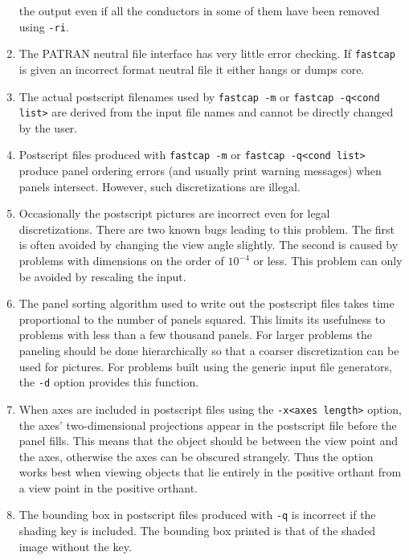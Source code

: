 \begin{enumerate}
the output even if all the conductors in some of them have been
removed using {\tt -ri}.
\item The PATRAN neutral file interface has very little error checking.
If {\tt fastcap} is given an incorrect format neutral file it either
hangs or dumps core.
\item The actual postscript filenames used by {\tt fastcap -m} or 
{\tt fastcap -q<cond list>} are derived from the input file names and cannot
be directly changed by the user.
\item Postscript files produced with {\tt fastcap -m} or 
{\tt fastcap -q<cond list>} produce panel ordering errors (and
usually print warning messages) when panels intersect. However, such
discretizations are illegal.
\item Occasionally the postscript pictures are incorrect even
for legal discretizations. There are two known bugs leading
to this problem.  The first is often avoided by changing
the view angle slightly. The second is caused by problems with
dimensions on the order of $10^{-4}$ or less. This problem can
only be avoided by rescaling the input. 
%
\item The panel sorting algorithm used to write out the postscript files
takes time proportional to the number of panels squared.  This limits
its usefulness to problems with less than a few thousand panels. For
larger problems the paneling should be done hierarchically so that
a coarser discretization can be used for pictures. For problems built
using the generic input file generators, the {\tt -d} option provides
this function.
\item When axes are included in postscript files using the
{\tt -x<axes length>} option, the axes' two-dimensional projections
appear in the postscript file before the panel fills. This means
that the object should be between the view point and the axes, otherwise
the axes can be obscured strangely. 
Thus
the option works best when viewing objects that lie entirely in
the positive orthant from a view point in the positive orthant.
\item The bounding box in postscript files produced with {\tt -q} is
incorrect if the shading key is included. The bounding box printed
is that of the shaded image without the key.

\end{enumerate}

